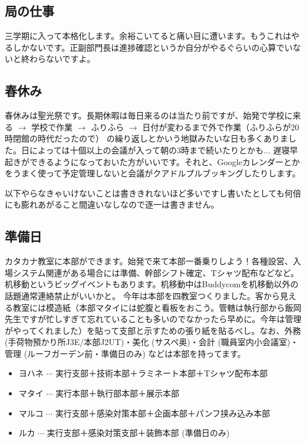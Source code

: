 \documentclass[dvipdfmx,jb5]{jarticle}
\begin{document}
\subsection{局の仕事}
三学期に入って本格化します。余裕こいてると痛い目に遭います。もうこれはやるしかないです。正副部門長は進捗確認というか自分がやるぐらいの心算でいないと終わらないですよ。

\subsection{春休み}
春休みは聖光祭です。長期休暇は毎日来るのは当たり前ですが、始発で学校に来る $\longrightarrow$ 学校で作業 $\longrightarrow$ ふりふら $\longrightarrow$ 日付が変わるまで外で作業（ふりふらが20時閉館の時代だったので） の繰り返しとかいう地獄みたいな日も多くありました。日によっては十個以上の会議が入って朝の3時まで続いたりとかも... 遅寝早起きができるようになっておいた方がいいです。それと、Googleカレンダーとかをうまく使って予定管理しないと会議がクアドルプルブッキングしたりします。

以下やらなきゃいけないことは書ききれないほど多いですし書いたとしても何倍にも膨れあがること間違いなしなので逐一は書きません。

\subsection{準備日}
カタカナ教室に本部ができます。始発で来て本部一番乗りしよう！各種設営、入場システム関連がある場合には準備、幹部シフト確定、Tシャツ配布などなど。机移動というビッグイベントもあります。机移動中はBuddycomを机移動以外の話題通常連絡禁止がいいかと。
今年は本部を四教室つくりました。客から見える教室には模造紙（本部マタイには蛇腹と看板をおこう。管轄は執行部から飯岡先生ですが忙しすぎて忘れていることも多いのでなかったら早めに。今年は管理がやってくれました）を貼って支部と示すための張り紙を貼るべし。なお、外務 (手荷物預かり所J3E/本部J2UT)・美化 (サスペ奥)・会計 (職員室内小会議室)・管理 (ルーフガーデン前・準備日のみ) などは本部を持ってます。
\begin{itemize}
  \item ヨハネ $\cdots$ 実行支部＋技術本部＋ラミネート本部＋Tシャツ配布本部
  \item マタイ $\cdots$ 実行本部＋執行部本部＋展示本部
  \item マルコ $\cdots$ 実行支部＋感染対策本部＋企画本部＋パンフ挟み込み本部
  \item ルカ $\cdots$ 実行支部＋感染対策支部＋装飾本部 (準備日のみ)
\end{itemize}
\end{document}
